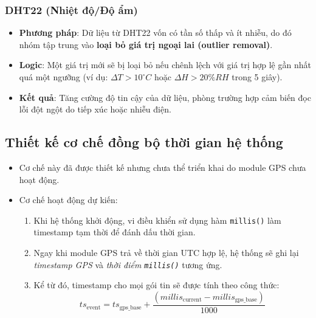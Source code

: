 \subsubsection{DHT22 (Nhiệt độ/Độ ẩm)}
\begin{itemize}
    \item \textbf{Phương pháp}: 
    Dữ liệu từ DHT22 vốn có tần số thấp và ít nhiễu, 
    do đó nhóm tập trung vào \textbf{loại bỏ giá trị ngoại lai (outlier removal)}.

    \item \textbf{Logic}: 
    Một giá trị mới sẽ bị loại bỏ nếu chênh lệch với giá trị hợp lệ gần nhất quá một ngưỡng 
    (ví dụ: $\Delta T > 10^{\circ}C$ hoặc $\Delta H > 20\%RH$ trong 5 giây).

    \item \textbf{Kết quả}: 
    Tăng cường độ tin cậy của dữ liệu, phòng trường hợp cảm biến đọc lỗi đột ngột 
    do tiếp xúc hoặc nhiễu điện.
\end{itemize}

\subsection{Thiết kế cơ chế đồng bộ thời gian hệ thống}

\begin{itemize}
    \item Cơ chế này đã được thiết kế nhưng chưa thể triển khai 
    do module GPS chưa hoạt động.

    \item Cơ chế hoạt động dự kiến:
    \begin{enumerate}
        \item Khi hệ thống khởi động, vi điều khiển sử dụng hàm \texttt{millis()} 
        làm timestamp tạm thời để đánh dấu thời gian.

        \item Ngay khi module GPS trả về thời gian UTC hợp lệ, 
        hệ thống sẽ ghi lại \textit{timestamp GPS} và 
        \textit{thời điểm \texttt{millis()}} tương ứng.

        \item Kể từ đó, timestamp cho mọi gói tin sẽ được tính theo công thức:
        \[
            ts_{\text{event}} = ts_{\text{gps\_base}} 
            + \frac{(millis_{\text{current}} - millis_{\text{gps\_base}})}{1000}
        \]
    \end{enumerate}
\end{itemize}

